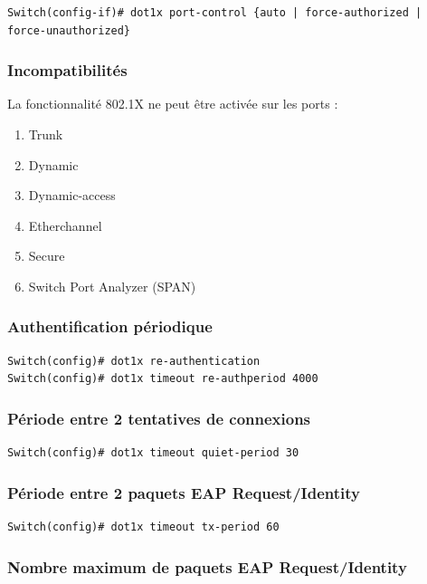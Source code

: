 \begin{verbatim}
Switch(config-if)# dot1x port-control {auto | force-authorized | force-unauthorized}
\end{verbatim}

\subsubsection{Incompatibilités}

La fonctionnalité 802.1X ne peut être activée sur les ports :
\begin{enumerate}
\item Trunk
\item Dynamic
\item Dynamic-access
\item Etherchannel
\item Secure
\item Switch Port Analyzer (SPAN)
\end{enumerate}

\subsubsection{Authentification périodique}

\begin{verbatim}
Switch(config)# dot1x re-authentication
Switch(config)# dot1x timeout re-authperiod 4000
\end{verbatim}

\subsubsection{Période entre 2 tentatives de connexions}

\begin{verbatim}
Switch(config)# dot1x timeout quiet-period 30
\end{verbatim}

\subsubsection{Période entre 2 paquets EAP Request/Identity}

\begin{verbatim}
Switch(config)# dot1x timeout tx-period 60
\end{verbatim}

\subsubsection{Nombre maximum de paquets EAP Request/Identity}


